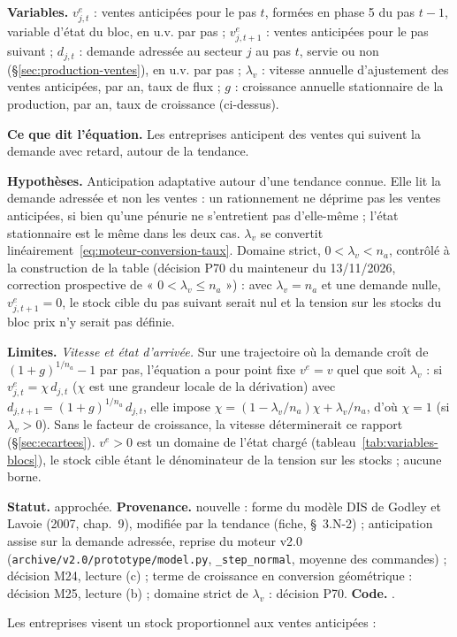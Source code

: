 \documentclass[11pt,a4paper]{article}
\newcommand{\variables}{\par\noindent\textbf{Variables.} }
\newcommand{\sens}{\par\noindent\textbf{Ce que dit l'équation.} }
\newcommand{\hyp}{\par\noindent\textbf{Hypothèses.} }
\newcommand{\limites}{\par\noindent\textbf{Limites.} }
\newcommand{\code}[1]{\texttt{\detokenize{#1}}}
\newcommand{\tracabilite}[3]{\par\smallskip\noindent\textbf{Statut.} #1. \textbf{Provenance.} #2. \textbf{Code.} \code{#3}.}
\begin{document}
\begin{lecture}
\variables $v^e_{j,t}$ : ventes anticipées pour le pas $t$, formées en phase 5 du pas $t-1$, variable d'état du bloc, en u.v. par pas ; $v^e_{j,t+1}$ : ventes anticipées pour le pas suivant ; $d_{j,t}$ : demande adressée au secteur $j$ au pas $t$, servie ou non (\S\ref{sec:production-ventes}), en u.v. par pas ; $\lambda_v$ : vitesse annuelle d'ajustement des ventes anticipées, par an, taux de flux ; $g$ : croissance annuelle stationnaire de la production, par an, taux de croissance (ci-dessus).
\sens Les entreprises anticipent des ventes qui suivent la demande avec retard, autour de la tendance.
\hyp Anticipation adaptative autour d'une tendance connue. Elle lit la demande adressée et non les ventes : un rationnement ne déprime pas les ventes anticipées, si bien qu'une pénurie ne s'entretient pas d'elle-même ; l'état stationnaire est le même dans les deux cas. $\lambda_v$ se convertit linéairement~\eqref{eq:moteur-conversion-taux}. Domaine strict, $0 < \lambda_v < n_a$, contrôlé à la construction de la table (décision P70 du mainteneur du 13/11/2026, correction prospective de « $0 < \lambda_v \le n_a$ ») : avec $\lambda_v = n_a$ et une demande nulle, $v^e_{j,t+1} = 0$, le stock cible du pas suivant serait nul et la tension sur les stocks du bloc prix n'y serait pas définie.
\limites \emph{Vitesse et état d'arrivée.} Sur une trajectoire où la demande croît de $(1 + g)^{1/n_a} - 1$ par pas, l'équation a pour point fixe $v^e = v$ quel que soit $\lambda_v$ : si $v^e_{j,t} = \chi\, d_{j,t}$ ($\chi$ est une grandeur locale de la dérivation) avec $d_{j,t+1} = (1 + g)^{1/n_a}\, d_{j,t}$, elle impose $\chi = (1 - \lambda_v/n_a)\chi + \lambda_v/n_a$, d'où $\chi = 1$ (si $\lambda_v > 0$). Sans le facteur de croissance, la vitesse déterminerait ce rapport (\S\ref{sec:ecartees}). $v^e > 0$ est un domaine de l'état chargé (tableau~\ref{tab:variables-blocs}), le stock cible étant le dénominateur de la tension sur les stocks ; aucune borne.
\tracabilite{approchée}{nouvelle : forme du modèle DIS de Godley et Lavoie (2007, chap.~9), modifiée par la tendance (fiche, \S~3.N-2) ; anticipation assise sur la demande adressée, reprise du moteur v2.0 (\texttt{archive/v2.0/prototype/model.py}, \texttt{\_step\_normal}, moyenne des commandes) ; décision M24, lecture (c) ; terme de croissance en conversion géométrique : décision M25, lecture (b) ; domaine strict de $\lambda_v$ : décision P70}{nations.blocs.production.ventes_anticipees}
\end{lecture}
Les entreprises visent un stock proportionnel aux ventes anticipées :
\end{document}
